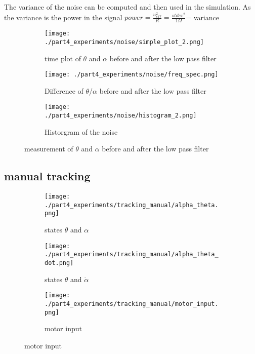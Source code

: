 	The variance of the noise can be computed and then used in the simulation. As the variance is the power in the signal $power = \frac{u_{eff}^2}{R} = \frac{stdev^2}{1 \Omega}$= variance
		
	\begin{figure}[H]
		\centering
		\begin{subfigure}[b]{0.40\textwidth}
			\texttt{[image: ./part4\_experiments/noise/simple\_plot\_2.png]}
			\caption{time plot of $\theta$ and $\alpha$ before and after the low pass filter}
			\label{fig:time noise}
		\end{subfigure}
		\begin{subfigure}[b]{0.40\textwidth}
			\texttt{[image: ./part4\_experiments/noise/freq\_spec.png]}
			\caption{Difference of $\theta$/$\alpha$ before and after the low pass filter}
			\label{fig:freq noise}
		\end{subfigure}
		\begin{subfigure}[b]{0.40\textwidth}
			\texttt{[image: ./part4\_experiments/noise/histogram\_2.png]}
			\caption{Historgram of the noise}
			\label{fig:hist noise}
		\end{subfigure}
		\caption{measurement of $\theta$ and $\alpha$ before and after the low pass filter}
	\end{figure}


\subsection{manual tracking}



	\begin{figure}[H]
		\centering
		\begin{subfigure}[b]{0.45\textwidth}
			\texttt{[image: ./part4\_experiments/tracking\_manual/alpha\_theta.png]}
			\caption{states $\theta$ and $\alpha$}
		\end{subfigure}
		\begin{subfigure}[b]{0.45\textwidth}
			\texttt{[image: ./part4\_experiments/tracking\_manual/alpha\_theta\_dot.png]}
			\caption{states $\dot{\theta}$ and $\dot{\alpha}$}
		\end{subfigure}
		\begin{subfigure}[b]{0.45\textwidth}
			\texttt{[image: ./part4\_experiments/tracking\_manual/motor\_input.png]}
			\caption{motor input}
		\end{subfigure}
	\end{figure}
